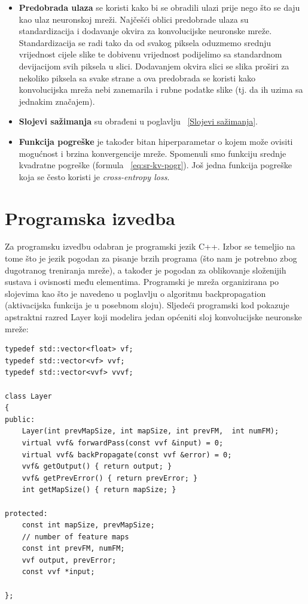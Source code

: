\documentclass[times, utf8, zavrsni, numeric]{fer}
\begin{document}
\begin{itemize}
\item \textbf{Predobrada ulaza} se koristi kako bi se obradili ulazi prije nego što se daju kao ulaz neuronskoj mreži. Najčešći oblici predobrade ulaza su standardizacija i dodavanje okvira za konvolucijske neuronske mreže. Standardizacija se radi tako da od svakog piksela oduzmemo srednju vrijednost cijele slike te dobivenu vrijednost podijelimo sa standardnom devijacijom svih piksela u slici. Dodavanjem okvira slici se slika proširi za nekoliko piksela sa svake strane a ova predobrada se koristi kako konvolucijska mreža nebi zanemarila i rubne podatke slike (tj. da ih uzima sa jednakim značajem).

\item \textbf{Slojevi sažimanja} su obrađeni u poglavlju ~\ref{Slojevi sažimanja}.

\item \textbf{Funkcija pogreške} je također bitan hiperparametar o kojem može ovisiti mogućnost i brzina konvergencije mreže. Spomenuli smo funkciju srednje kvadratne pogreške (formula ~\ref{eq:sr-kv-pogr}). Još jedna funkcija pogreške koja se često koristi je \textit{cross-entropy loss}.

\end{itemize}

\chapter{Programska izvedba}
Za programsku izvedbu odabran je programski jezik C++. Izbor se temeljio na tome što je jezik pogodan za pisanje brzih programa (što nam je potrebno zbog dugotranog treniranja mreže), a također je pogodan za oblikovanje složenijih sustava i ovisnosti među elementima. Programski je mreža organizirana po slojevima kao što je navedeno u poglavlju o algoritmu backpropagation (aktivacijska funkcija je u posebnom sloju). Sljedeći programski kod pokazuje apstraktni razred Layer koji modelira jedan općeniti sloj konvolucijske neuronske mreže:

\renewcommand{\lstlistingname}{Programski kod}
\begin{lstlisting}[caption=Razred Layer,
  label=Layer]
typedef std::vector<float> vf;
typedef std::vector<vf> vvf;
typedef std::vector<vvf> vvvf;

class Layer
{
public:
    Layer(int prevMapSize, int mapSize, int prevFM,  int numFM);
    virtual vvf& forwardPass(const vvf &input) = 0;
    virtual vvf& backPropagate(const vvf &error) = 0;
    vvf& getOutput() { return output; }
    vvf& getPrevError() { return prevError; }
    int getMapSize() { return mapSize; }

protected:
    const int mapSize, prevMapSize;
    // number of feature maps
    const int prevFM, numFM;
    vvf output, prevError;
    const vvf *input;

};
\end{lstlisting}
\end{document}
